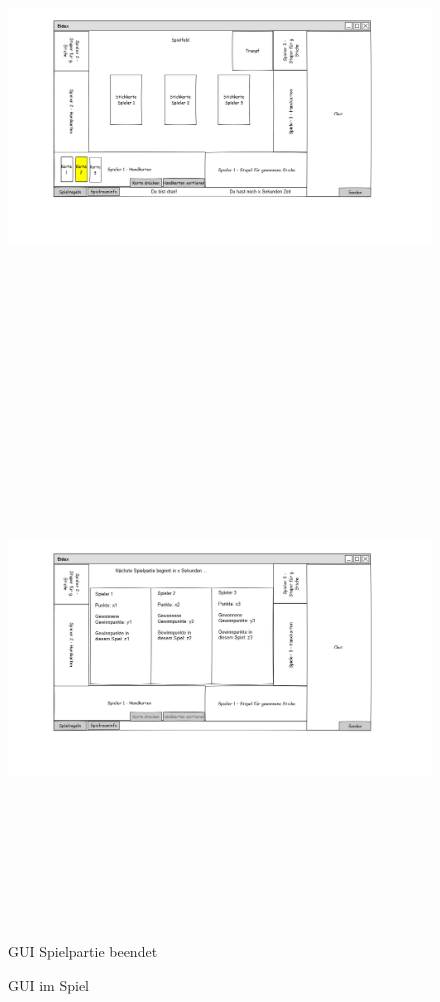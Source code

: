 \begin{center}
	\begin{figure}
		\hspace*{-1.5cm}
		\includegraphics[width=170mm, height =140mm]{PencilProjectData/imSpiel_neu}
		\includegraphics[width=170mm, height =140mm]{PencilProjectData/spielpartie_beendet}
		\caption{GUI Spielpartie beendet}
		\caption{GUI im Spiel}
	\end{figure}



\end{center}

	
	
	
	